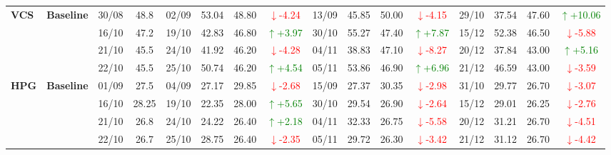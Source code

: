 \documentclass{ieeeaccess}
\begin{document}
{\begin{longtable}{llcc|cccc|cccc|cccc}
\multirow{4}{*}{\textbf{VCS}}
& \textbf{Baseline}
& 30/08 & 48.8 & 02/09 & 53.04 & 48.80 & \textcolor{red}{\(\downarrow\)-4.24} & 13/09 & 45.85 & 50.00 & \textcolor{red}{\(\downarrow\)-4.15} & 29/10 & 37.54 & 47.60 & \textcolor{green}{\(\uparrow\)+10.06} \\
& & 16/10 & 47.2 & 19/10 & 42.83 & 46.80 & \textcolor{green}{\(\uparrow\)+3.97} & 30/10 & 55.27 & 47.40 & \textcolor{green}{\(\uparrow\)+7.87} & 15/12 & 52.38 & 46.50 & \textcolor{red}{\(\downarrow\)-5.88} \\
& & 21/10 & 45.5 & 24/10 & 41.92 & 46.20 & \textcolor{red}{\(\downarrow\)-4.28} & 04/11 & 38.83 & 47.10 & \textcolor{red}{\(\downarrow\)-8.27} & 20/12 & 37.84 & 43.00 & \textcolor{green}{\(\uparrow\)+5.16} \\
& & 22/10 & 45.5 & 25/10 & 50.74 & 46.20 & \textcolor{green}{\(\uparrow\)+4.54} & 05/11 & 53.86 & 46.90 & \textcolor{green}{\(\uparrow\)+6.96} & 21/12 & 46.59 & 43.00 & \textcolor{red}{\(\downarrow\)-3.59} \\
\midrule

\multirow{4}{*}{\textbf{HPG}}
& \textbf{Baseline}
& 01/09 & 27.5 & 04/09 & 27.17 & 29.85 & \textcolor{red}{\(\downarrow\)-2.68} & 15/09 & 27.37 & 30.35 & \textcolor{red}{\(\downarrow\)-2.98} & 31/10 & 29.77 & 26.70 & \textcolor{red}{\(\downarrow\)-3.07} \\
& & 16/10 & 28.25 & 19/10 & 22.35 & 28.00 & \textcolor{green}{\(\uparrow\)+5.65} & 30/10 & 29.54 & 26.90 & \textcolor{red}{\(\downarrow\)-2.64} & 15/12 & 29.01 & 26.25 & \textcolor{red}{\(\downarrow\)-2.76} \\
& & 21/10 & 26.8 & 24/10 & 24.22 & 26.40 & \textcolor{green}{\(\uparrow\)+2.18} & 04/11 & 32.33 & 26.75 & \textcolor{red}{\(\downarrow\)-5.58} & 20/12 & 31.21 & 26.70 & \textcolor{red}{\(\downarrow\)-4.51} \\
& & 22/10 & 26.7 & 25/10 & 28.75 & 26.40 & \textcolor{red}{\(\downarrow\)-2.35} & 05/11 & 29.72 & 26.30 & \textcolor{red}{\(\downarrow\)-3.42} & 21/12 & 31.12 & 26.70 & \textcolor{red}{\(\downarrow\)-4.42} \\
\midrule


\end{longtable}}
\end{document}
